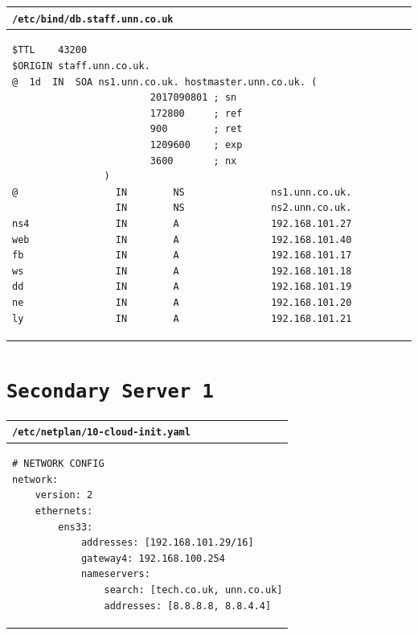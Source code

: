 \documentclass[11pt]{article}
\begin{document}
\begin{table}[ht]
    \begin{tabular}{|p{17.7cm}|} 
        \hline
        \texttt{\textbf{/etc/bind/db.staff.unn.co.uk}}\\ 
        \hline
        \lstset{
                basicstyle=\scriptsize\ttfamily,
              }
              \begin{lstlisting}
$TTL    43200 
$ORIGIN staff.unn.co.uk.
@  1d  IN  SOA ns1.unn.co.uk. hostmaster.unn.co.uk. (
                        2017090801 ; sn
                        172800     ; ref
                        900        ; ret
                        1209600    ; exp
                        3600       ; nx
                )
@                 IN        NS               ns1.unn.co.uk.
                  IN        NS               ns2.unn.co.uk.
ns4               IN        A                192.168.101.27
web               IN        A                192.168.101.40
fb                IN        A                192.168.101.17                                
ws                IN        A                192.168.101.18                                
dd                IN        A                192.168.101.19                                
ne                IN        A                192.168.101.20                        
ly                IN        A                192.168.101.21
        \end{lstlisting}\\
        \hline
    \end{tabular}
\end{table}

\clearpage
\section{\texttt{Secondary Server 1}}

\begin{table}[ht]
    \begin{tabular}{|p{17.7cm}|} 
        \hline
        \texttt{\textbf{/etc/netplan/10-cloud-init.yaml}}\\ 
        \hline
        \lstset{
                basicstyle=\scriptsize\ttfamily,
              }
              \begin{lstlisting}
# NETWORK CONFIG
network:
    version: 2
    ethernets:
        ens33:
            addresses: [192.168.101.29/16]
            gateway4: 192.168.100.254
            nameservers:
                search: [tech.co.uk, unn.co.uk]
                addresses: [8.8.8.8, 8.8.4.4]
        \end{lstlisting}\\
        \hline
    \end{tabular}
\end{table}
\end{document}
